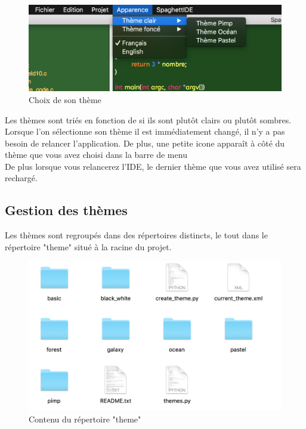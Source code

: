 \documentclass[a4paper,12pt]{article}
\begin{document}
			\begin{figure}[h!]
				\begin{center}
					\includegraphics[scale=0.7]{imgs/choix_theme}
					\caption{Choix de son thème}
				\end{center}
			\end{figure}
			
			Les thèmes sont triés en fonction de si ils sont plutôt clairs ou plutôt sombres.\\
			Lorsque l'on sélectionne son thème il est immédiatement changé, il n'y a pas besoin de relancer l'application. De plus, une petite icone apparaît à côté du thème que vous avez choisi dans la barre de menu\\
			
			De plus lorsque vous relancerez l'IDE, le dernier thème que vous avez utilisé sera rechargé.
			
		\subsection{Gestion des thèmes}
		
			Les thèmes sont regroupés dans des répertoires distincts, le tout dans le répertoire "theme" situé à la racine du projet. 
			\begin{figure}[h!]
				\begin{center}
					\includegraphics[scale=0.7]{imgs/themes}
					\caption{Contenu du répertoire "theme"}
				\end{center}
			\end{figure}
			
\end{document}
